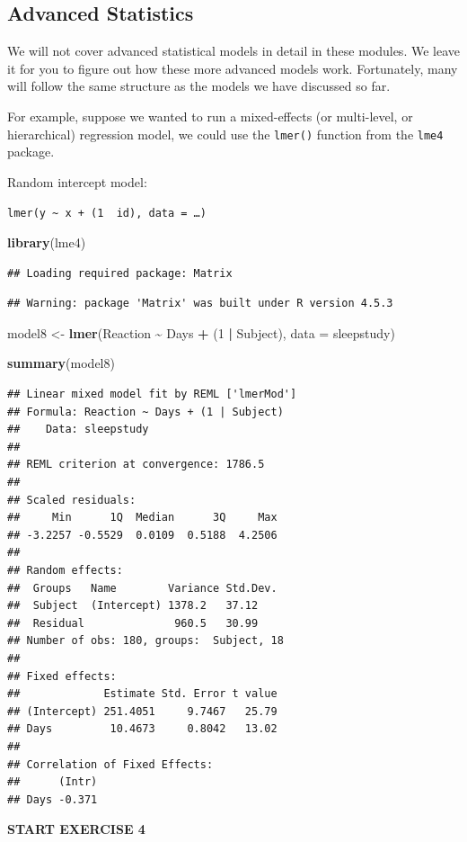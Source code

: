 \documentclass[
]{book}
\newenvironment{Shaded}{\begin{snugshade}}{\end{snugshade}}
\newcommand{\AttributeTok}[1]{\textcolor[rgb]{0.13,0.29,0.53}{#1}}
\newcommand{\DecValTok}[1]{\textcolor[rgb]{0.00,0.00,0.81}{#1}}
\newcommand{\FunctionTok}[1]{\textcolor[rgb]{0.13,0.29,0.53}{\textbf{#1}}}
\newcommand{\NormalTok}[1]{#1}
\newcommand{\OtherTok}[1]{\textcolor[rgb]{0.56,0.35,0.01}{#1}}
\newcommand{\SpecialCharTok}[1]{\textcolor[rgb]{0.81,0.36,0.00}{\textbf{#1}}}
\begin{document}
\subsection{Advanced Statistics}\label{advanced-statistics}

We will not cover advanced statistical models in detail in these modules. We leave it for you to figure out how these more advanced models work. Fortunately, many will follow the same structure as the models we have discussed so far.

For example, suppose we wanted to run a mixed-effects (or multi-level, or hierarchical) regression model, we could use the \texttt{lmer()} function from the \texttt{lme4} package.

Random intercept model:

\texttt{lmer(y\ \textasciitilde{}\ x\ +\ (1\ \textbar{}\ id),\ data\ =\ …)}

\begin{Shaded}
\begin{Highlighting}[]
\FunctionTok{library}\NormalTok{(lme4)}
\end{Highlighting}
\end{Shaded}

\begin{verbatim}
## Loading required package: Matrix
\end{verbatim}

\begin{verbatim}
## Warning: package 'Matrix' was built under R version 4.5.3
\end{verbatim}

\begin{Shaded}
\begin{Highlighting}[]
\NormalTok{model8 }\OtherTok{\textless{}{-}} \FunctionTok{lmer}\NormalTok{(Reaction }\SpecialCharTok{\textasciitilde{}}\NormalTok{ Days }\SpecialCharTok{+}\NormalTok{ (}\DecValTok{1} \SpecialCharTok{|}\NormalTok{ Subject), }\AttributeTok{data =}\NormalTok{ sleepstudy)}

\FunctionTok{summary}\NormalTok{(model8)}
\end{Highlighting}
\end{Shaded}

\begin{verbatim}
## Linear mixed model fit by REML ['lmerMod']
## Formula: Reaction ~ Days + (1 | Subject)
##    Data: sleepstudy
## 
## REML criterion at convergence: 1786.5
## 
## Scaled residuals: 
##     Min      1Q  Median      3Q     Max 
## -3.2257 -0.5529  0.0109  0.5188  4.2506 
## 
## Random effects:
##  Groups   Name        Variance Std.Dev.
##  Subject  (Intercept) 1378.2   37.12   
##  Residual              960.5   30.99   
## Number of obs: 180, groups:  Subject, 18
## 
## Fixed effects:
##             Estimate Std. Error t value
## (Intercept) 251.4051     9.7467   25.79
## Days         10.4673     0.8042   13.02
## 
## Correlation of Fixed Effects:
##      (Intr)
## Days -0.371
\end{verbatim}

\textbf{START EXERCISE 4}


\end{document}

